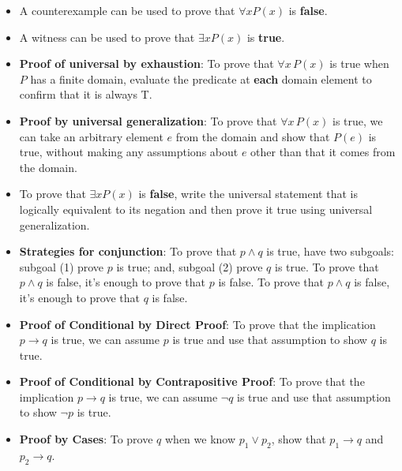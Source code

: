 \documentclass[12pt, oneside]{article}
\begin{document}
\begin{itemize}
    \item A counterexample can be used to prove that  $\forall x P(x)$ is {\bf false}.
    \item  A witness can be used  to  prove that  $\exists x P(x)$ is {\bf true}.
    \item {\bf Proof of universal by exhaustion}: To prove that $\forall x \, P(x)$
is true when $P$ has a finite domain, evaluate the predicate at {\bf each} domain element to confirm that it is always T.
    \item  {\bf Proof by universal generalization}: To prove that $\forall x \, P(x)$
is true, we can take an arbitrary element $e$ from the domain and show that $P(e)$ is true, without making any assumptions about $e$ other than that it comes from the domain.
    \item To  prove  that $\exists x P(x)$ is {\bf false}, write the universal statement that is logically equivalent to its negation and then prove it true using universal generalization.
    \item {\bf Strategies for conjunction}: To prove that $p \land q$ is true, have two subgoals: subgoal (1) prove $p$ 
is  true; and, subgoal (2) prove $q$ is true. To prove that $p \land q$ is false, it's enough to prove that $p$ is false.
 To prove that $p \land q$ is false, it's enough to prove that $q$ is false.
    \item {\bf Proof of Conditional by Direct Proof}: To prove that the implication $p \to q$ is true, we can assume $p$ is true and use that assumption to show $q$ is true.
    \item {\bf Proof of Conditional by Contrapositive Proof}: To prove that the implication $p \to q$ is true, we can assume $\neg q$ is true and use that assumption to show $\neg p$ is true.
    \item {\bf Proof by Cases}: To prove $q$ when we know $p_1 \lor p_2$, show that $p_1 \to q$ and $p_2 \to q$.
\end{itemize}
\end{document}
